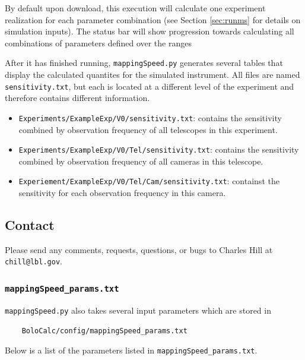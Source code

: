 \documentclass[11pt]{article} %
\begin{document}
By default upon download, this execution will calculate one experiment realization for each parameter combination (see Section \ref{sec:runms} for details on simulation inputs). The status bar will show progression towards calculating all combinations of parameters defined over the ranges 

After it has finished running, \texttt{mappingSpeed.py} generates several tables that display the calculated quantites for the simulated instrument. All files are named \texttt{sensitivity.txt}, but each is located at a different level of the experiment and therefore contains different information.

\begin{itemize}
	\item \texttt{Experiments/ExampleExp/V0/sensitivity.txt}: contains the sensitivity combined by observation frequency of all telescopes in this experiment.
	\item \texttt{Experiments/ExampleExp/V0/Tel/sensitivity.txt}: contains the sensitivity combined by observation frequency of all cameras in this telescope.
	\item \texttt{Experiement/ExampleExp/V0/Tel/Cam/sensitivity.txt}: containst the sensitivity for each observation frequency in this camera.
\end{itemize}


\subsection{Contact}

Please send any comments, requests, questions, or bugs to Charles Hill at \texttt{chill@lbl.gov}.


\iffalse
\subsubsection{\texttt{mappingSpeed\_params.txt}}

\texttt{mappingSpeed.py} also takes several input parameters which are stored in 

\begin{lstlisting}
	BoloCalc/config/mappingSpeed_params.txt
\end{lstlisting}

Below is a list of the parameters listed in \texttt{mappingSpeed\_params.txt}.
\end{document}
